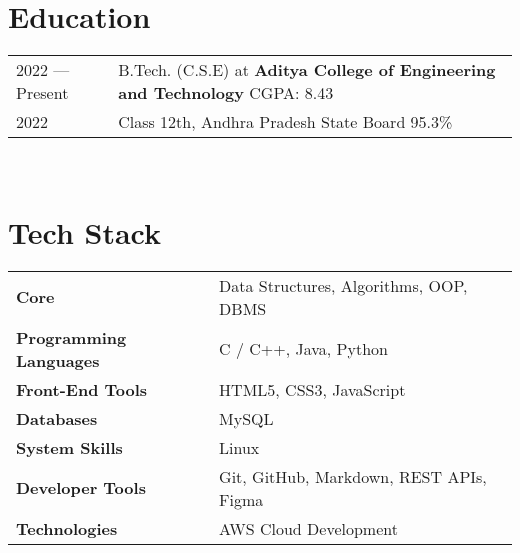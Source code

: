 \documentclass[a4paper,10pt]{article}
\begin{document}

\section{Education}
\begin{tabularx}{\linewidth}{@{}l X@{}}	
2022 --- Present & B.Tech. (C.S.E) at \textbf{Aditya College of Engineering and Technology}  \hfill \textcolor{Gray} \hfill \normalsize CGPA: 8.43 \\

2022 & Class 12th, Andhra Pradesh State Board \hfill 95.3\% \\
\end{tabularx}  \\[-0.4em]


\section{Tech Stack}
\begin{tabularx}{\linewidth}{@{}l X@{}}
\textbf{Core} & \textcolor{bullets}{Data Structures, Algorithms, OOP, DBMS} \\
\textbf{Programming Languages} & \textcolor{bullets}{C / C++, Java, Python} \\
\textbf{Front-End Tools} & \textcolor{bullets}{HTML5, CSS3, JavaScript} \\
\textbf{Databases} & \textcolor{bullets}{MySQL} \\
\textbf{System Skills} & \textcolor{bullets}{Linux} \\
\textbf{Developer Tools} & \textcolor{bullets}{Git, GitHub, Markdown, REST APIs, Figma}  \\
\textbf{Technologies} & \textcolor{bullets}{AWS Cloud Development}  \\[-0.2em]


\end{tabularx}
\end{document}
